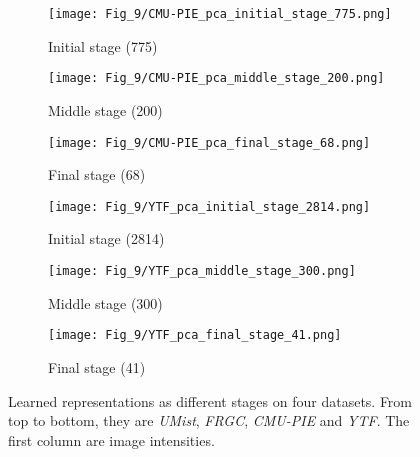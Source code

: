 \documentclass[10pt,twocolumn,letterpaper]{article}
\begin{document}
\begin{figure*}
   \begin{subfigure}{0.33\linewidth}
   \centering
    \texttt{[image: Fig\_9/CMU-PIE\_pca\_initial\_stage\_775.png]}
    \vspace{-5pt}
    \caption{Initial stage (775)}
          \vspace{20pt}
   \end{subfigure}
   \begin{subfigure}{0.33\linewidth}
   \centering
    \texttt{[image: Fig\_9/CMU-PIE\_pca\_middle\_stage\_200.png]}
    \vspace{-5pt}
    \caption{Middle stage (200)}
          \vspace{20pt}
   \end{subfigure}
   \begin{subfigure}{0.33\linewidth}
   \centering
       \texttt{[image: Fig\_9/CMU-PIE\_pca\_final\_stage\_68.png]}
   \vspace{-5pt}
   \caption{Final stage (68)}
         \vspace{20pt}
   \end{subfigure}

   \begin{subfigure}{0.33\linewidth}
   \centering
    \texttt{[image: Fig\_9/YTF\_pca\_initial\_stage\_2814.png]}
    \vspace{-5pt}
    \caption{Initial stage (2814)}
          \vspace{20pt}
   \end{subfigure}
   \begin{subfigure}{0.33\linewidth}
   \centering
    \texttt{[image: Fig\_9/YTF\_pca\_middle\_stage\_300.png]}
    \vspace{-5pt}
    \caption{Middle stage (300)}
          \vspace{20pt}
   \end{subfigure}
   \begin{subfigure}{0.33\linewidth}
   \centering
       \texttt{[image: Fig\_9/YTF\_pca\_final\_stage\_41.png]}
   \vspace{-5pt}
   \caption{Final stage (41)}
      \vspace{20pt}
   \end{subfigure}
   \vspace{-5pt}
   \caption{Learned representations as different stages on four datasets. From top to bottom, they are \textit{UMist}, \textit{FRGC}, \textit{CMU-PIE} and \textit{YTF}. The first column are image intensities.}
   \label{Fig_PCA_Display_4}
\end{figure*}
\end{document}
